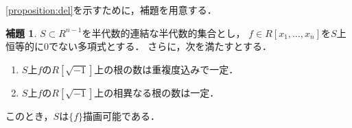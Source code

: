 \documentclass[uplatex, dvipdfmx]{jsarticle}
\numberwithin{equation}{section}
\theoremstyle{definition}
\newtheorem{lemma}[definition]{補題}
\begin{document}
\cref{proposition:del}を示すために，補題を用意する．

\begin{lemma}\label{lemma:del}
     $S \subset R^{n-1}$を半代数的連結な半代数的集合とし，     
     $f \in R[x_1, \dots, x_n]$を$S$上恒等的に$0$でない多項式とする．
     さらに，次を満たすとする．
     \begin{enumerate}
          \item \label{lemma:del-1}
          $S$上$f$の$R[\sqrt{-1}]$上の根の数は重複度込みで一定．
          \item \label{lemma:del-2}
          $S$上$f$の$R[\sqrt{-1}]$上の相異なる根の数は一定．
     \end{enumerate}
     このとき，$S$は$\{f\}$描画可能である．
\end{lemma}
\end{document}
